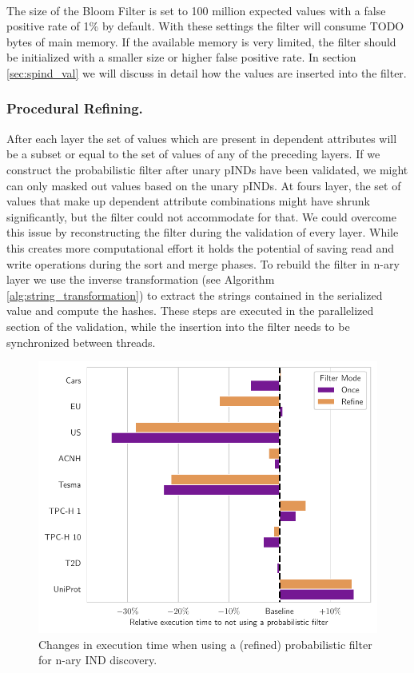 \noindent \\ The size of the Bloom Filter is set to 100 million expected values with a false positive rate of 1\% by default. With these settings the filter will consume TODO bytes of main memory. If the available memory is very limited, the filter should be initialized with a smaller size or higher false positive rate. In section \ref{sec:spind_val} we will discuss in detail how the values are inserted into the filter.

\subsubsection{Procedural Refining.} After each layer the set of values which are present in dependent attributes will be a subset or equal to the set of values of any of the preceding layers. If we construct the probabilistic filter after unary pINDs have been validated, we might can only masked out values based on the unary pINDs. At fours layer, the set of values that make up dependent attribute combinations might have shrunk significantly, but the filter could not accommodate for that. We could overcome this issue by reconstructing the filter during the validation of every layer. While this creates more computational effort it holds the potential of saving read and write operations during the sort and merge phases. To rebuild the filter in n-ary layer we use the inverse transformation (see Algorithm \ref{alg:string_transformation}) to extract the strings contained in the serialized value and compute the hashes. These steps are executed in the parallelized section of the validation, while the insertion into the filter needs to be synchronized between threads.

\begin{figure}
    \centering
    \includegraphics[width=.48\textwidth]{figures/filter_results.pdf}
    \caption{Changes in execution time when using a (refined) probabilistic filter for n-ary IND discovery.}
    \label{fig:filter}
\end{figure}

